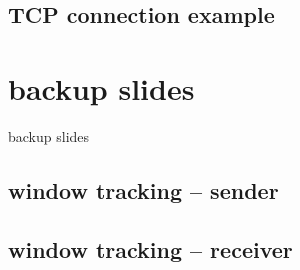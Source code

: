 \subsection{TCP connection example}




\section{backup slides}
\begin{frame}{backup slides}
\end{frame}

\subsection{window tracking -- sender}


\subsection{window tracking -- receiver}




